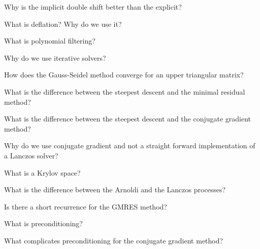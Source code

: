 \begin{Sheet}
  \begin{Problem}
	  Why is the implicit double shift better than the explicit?
  \end{Problem}

  \begin{Problem}
	  What is deflation? Why do we use it?
  \end{Problem}

  \begin{Problem}
	  What is polynomial filtering?
  \end{Problem}
	
  \begin{Problem}
	  Why do we use iterative solvers?
  \end{Problem}

  \begin{Problem}
	  How does the Gauss-Seidel method converge for an upper triangular matrix?
  \end{Problem}

	  \begin{Problem}
		  What is the difference between the steepest descent and the minimal residual method?
	  \end{Problem}
  
	  \begin{Problem}
		  What is the difference between the steepest descent and the conjugate gradient method?
	  \end{Problem}

	  \begin{Problem}
		  Why do we use conjugate gradient and not a straight forward implementation of a Lanczos solver?
	  \end{Problem}

	  \begin{Problem}
		  What is a Krylov space?
	  \end{Problem}

	  \begin{Problem}
		  What is the difference between the Arnoldi and the Lanczos processes?
	  \end{Problem}

	  \begin{Problem}
		  Is there a short recurrence for the GMRES method?
	  \end{Problem}

	  \begin{Problem}
		  What is preconditioning?
	  \end{Problem}

	  \begin{Problem}
		  What complicates preconditioning for the conjugate gradient method?
	  \end{Problem}

\end{Sheet}


